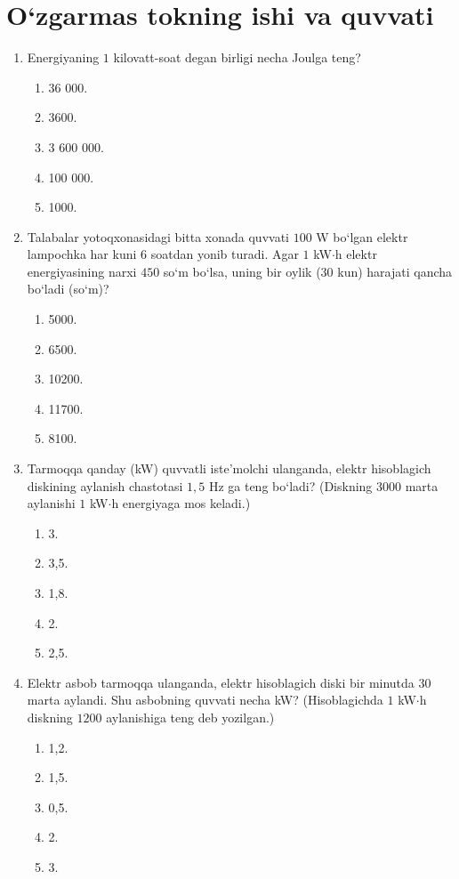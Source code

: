 


\section{O`zgarmas tokning ishi va quvvati}


\begin{enumerate}

\item Energiyaning $1$ kilovatt-soat degan birligi necha Joulga teng?
\begin{enumerate}[label=\Alph*)]
\item 36 000.
\item 3600.
\item 3 600 000.
\item 100 000.
\item 1000.
\end{enumerate}

\item Talabalar yotoqxonasidagi bitta xonada quvvati $100$ W bo‘lgan elektr lampochka har kuni $6$ soatdan yonib turadi. Agar $1$ kW$\cdot$h elektr energiyasining narxi $450$ so‘m bo‘lsa, uning bir oylik ($30$ kun) harajati qancha bo‘ladi (so‘m)?
\begin{enumerate}[label=\Alph*)]
\item 5000.
\item 6500.
\item 10200.
\item 11700.
\item 8100.
\end{enumerate}

\item Tarmoqqa qanday (kW) quvvatli iste’molchi ulanganda, elektr hisoblagich diskining aylanish chastotasi $1,5$ Hz ga teng bo‘ladi? (Diskning $3000$ marta aylanishi $1$ kW$\cdot$h energiyaga mos keladi.)
\begin{enumerate}[label=\Alph*)]
\item 3.
\item 3,5.
\item 1,8.
\item 2.
\item 2,5.
\end{enumerate}

\item Elektr asbob tarmoqqa ulanganda, elektr hisoblagich diski bir minutda $30$ marta aylandi. Shu asbobning quvvati necha kW? (Hisoblagichda $1$ kW$\cdot$h diskning $1200$ aylanishiga teng deb yozilgan.)
\begin{enumerate}[label=\Alph*)]
\item 1,2.
\item 1,5.
\item 0,5.
\item 2.
\item 3.
\end{enumerate}


\end{enumerate}

